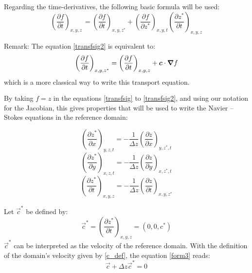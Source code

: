 Regarding the time-derivatives, the following basic formula will be used:
\begin{equation}
\left(  \dfrac{\partial f}{\partial t}\right)_{x,y,z\,}=\left(
\dfrac{\partial f}{\partial t}\right)_{x,y,z^{\ast}}+\left(
\dfrac{\partial f}{\partial z^{\ast}}\right)_{x,y,t}\left(
\dfrac{\partial z^{\ast}}{\partial t}\right)_{x,y,z} \label{transfsig2}%
\end{equation}

\begin{CommentBlock}{Remark:}
The equation \eqref{transfsig2} is equivalent to:
\begin{equation}\label{transfsig2bis}
\left(\dfrac{\partial f}{\partial t}\right)_{x,y,z^*}=\left(\dfrac{\partial f}{\partial t}\right)_{x,y,z}
+\bm{c} \cdot \bm{\nabla} f
\end{equation}
which is a more  classical way to write this transport equation.
\end{CommentBlock}


By taking $f=z$ in the equations \eqref{transfsig} to \eqref{transfsig2},
and using our notation for the Jacobian, this
gives properties that will be used to write the Navier -- Stokes equations
in the reference domain:

\begin{equation}
\left(\dfrac{\partial z^{\ast}}{\partial x}\right)_{y,z,t}
=-\dfrac{1}{\Delta z}\left(\dfrac{\partial z}{\partial x}\right)
_{y,z^{\ast},t} \label{form1}%
\end{equation}
%
\begin{equation}
\left(\dfrac{\partial z^{\ast}}{\partial y}\right)_{x,z,t}
=-\dfrac{1}{\Delta z}\left(\dfrac{\partial z}{\partial y}\right)
_{x,z^{\ast},t} \label{form2}%
\end{equation}
%
\begin{equation}
\left(\dfrac{\partial z^{\ast}}{\partial t}\right)_{x,y,z}
=-\dfrac{1}{\Delta z}\left(\dfrac{\partial z}{\partial t}\right)
_{x,y,z^{\ast}} \label{form3}%
\end{equation}

Let $\vec{c}^*$ be defined by:
\begin{equation}\label{c*_def}
\vec{c}^*=\left(\dfrac{\partial z^*}{\partial t}\right)_{x,y,z}=\left(0, 0, c^*\right)
\end{equation}
$\vec{c}^*$ can be interpreted as the velocity of the reference domain.
With the definition of the domain's velocity given by \eqref{c_def}, the equation
\eqref{form3} reads:
\begin{equation}\label{velocitiesmesh}
\vec{c}+\Delta z\vec{c}^*=0
\end{equation}

